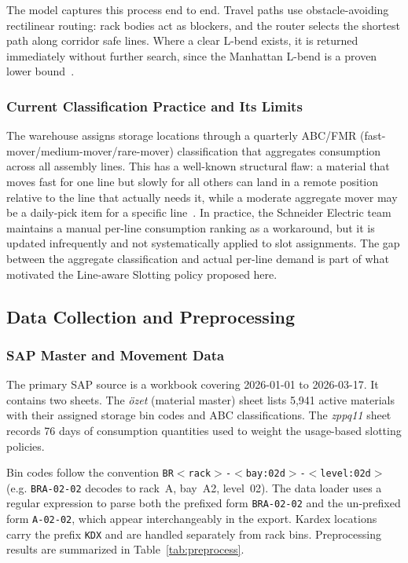 The model captures this process end to end. Travel paths use obstacle-avoiding rectilinear routing: rack bodies act as blockers, and the router selects the shortest path along corridor safe lines. Where a clear L-bend exists, it is returned immediately without further search, since the Manhattan L-bend is a proven lower bound~\cite{bartholdi2014}.

\subsubsection{Current Classification Practice and Its Limits}

The warehouse assigns storage locations through a quarterly ABC/FMR (fast-mover/medium-mover/rare-mover) classification that aggregates consumption across all assembly lines. This has a well-known structural flaw: a material that moves fast for one line but slowly for all others can land in a remote position relative to the line that actually needs it, while a moderate aggregate mover may be a daily-pick item for a specific line~\cite{flores1986,frazelle2002}. In practice, the Schneider Electric team maintains a manual per-line consumption ranking as a workaround, but it is updated infrequently and not systematically applied to slot assignments. The gap between the aggregate classification and actual per-line demand is part of what motivated the Line-aware Slotting policy proposed here.

\subsection{Data Collection and Preprocessing}\label{sec:data}

\subsubsection{SAP Master and Movement Data}

The primary SAP source is a workbook covering 2026-01-01 to 2026-03-17. It contains two sheets. The \emph{özet} (material master) sheet lists 5,941 active materials with their assigned storage bin codes and ABC classifications. The \emph{zppq11} sheet records 76 days of consumption quantities used to weight the usage-based slotting policies.

Bin codes follow the convention \texttt{BR\(<\)rack\(>\)-\(<\)bay:02d\(>\)-\(<\)level:02d\(>\)} (e.g. \texttt{BRA-02-02} decodes to rack~A, bay~A2, level~02). The data loader uses a regular expression to parse both the prefixed form \texttt{BRA-02-02} and the un-prefixed form \texttt{A-02-02}, which appear interchangeably in the export. Kardex locations carry the prefix \texttt{KDX} and are handled separately from rack bins. Preprocessing results are summarized in Table~\ref{tab:preprocess}.

